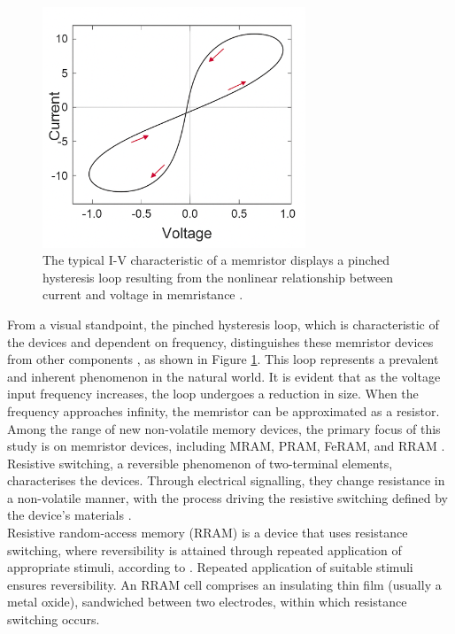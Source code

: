 \begin{figure}[htbp!] 
    \centering    
    \includegraphics[width=0.7\textwidth]{Chapter2/Figs/f.png}
    \caption[Typical I-V characteristic of a memristor]{The typical I-V characteristic  of a memristor displays a pinched hysteresis loop resulting from the nonlinear relationship between current and voltage in memristance \cite{wen2012dynamics}.}
    \label{fig:2f}
\end{figure}
    
\noindent From a visual standpoint, the pinched hysteresis loop, which is characteristic of the devices and dependent on frequency, distinguishes these memristor devices from other components \cite{chua2019resistance}, as shown in Figure \ref{fig:2f}. This loop represents a prevalent and inherent phenomenon in the natural world. It is evident that as the voltage input frequency increases, the loop undergoes a reduction in size. When the frequency approaches infinity, the memristor can be approximated as a resistor.\\

\noindent Among the range of new non-volatile memory devices, the primary focus of this study is on memristor devices, including MRAM, PRAM, FeRAM, and RRAM \cite{wang2017memristors}. Resistive switching, a reversible phenomenon of two-terminal elements, characterises the devices. Through electrical signalling, they change resistance in a non-volatile manner, with the process driving the resistive switching defined by the device's materials \cite{mehonic2018silicon}. \\

\noindent Resistive random-access memory (RRAM) is a device that uses resistance switching, where reversibility is attained through repeated application of appropriate stimuli, according to \cite{liu2010controllable}. Repeated application of suitable stimuli ensures reversibility. An RRAM cell comprises an insulating thin film (usually a metal oxide), sandwiched between two electrodes, within which resistance switching occurs. \\

